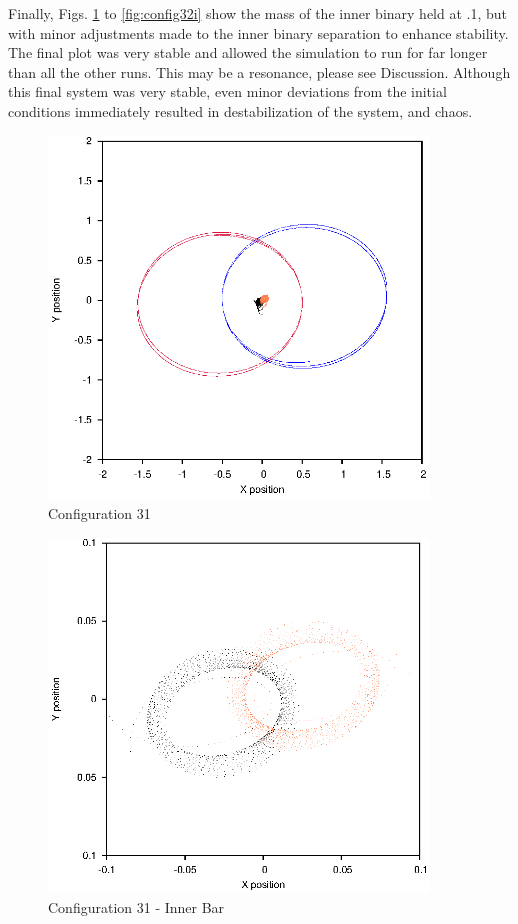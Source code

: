 \documentclass[a4paper,12pt]{article}
\begin{document}
Finally, Figs. \ref{fig:config31} to \ref{fig:config32i} show the mass of the inner binary held at .1, but with minor adjustments made to the inner binary separation to enhance stability.
The final plot was very stable and allowed the simulation to run for far longer than all the other runs. This may be a resonance, please see Discussion. Although this final system was
very stable, even minor deviations from the initial conditions immediately resulted in destabilization of the system, and chaos.
\begin{figure}[H]
\centering
\includegraphics[width=0.9\textwidth]{./2017results/1-1-102-1/Orbit.eps}
\caption{Configuration 31}
\label{fig:config31}
\end{figure}
\begin{figure}[H]
\centering
\includegraphics[width=0.9\textwidth]{./2017results/1-1-102-1/Inner.eps}
\caption{Configuration 31 - Inner Bar}
\label{fig:config31i}
\end{figure}
\end{document}
